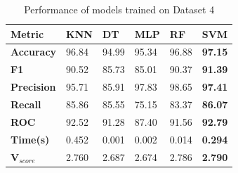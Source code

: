 \begin{table}[H]
  \centering
  \caption{Performance of models trained on Dataset 4}\label{tab:performance_of_models_trained_on_dataset_4}
  \begin{tabular}{|p{5em}|C{3em}|C{3em}|C{3em}|C{3em}|C{3em}|}
    \hline
    \textbf{Metric}      & \textbf{KNN} & \textbf{DT} & \textbf{MLP} & \textbf{RF} & \textbf{SVM}   \\
    \hline
    \textbf{Accuracy}    & 96.84        & 94.99       & 95.34        & 96.88       & \textbf{97.15} \\
    \textbf{F1}          & 90.52        & 85.73       & 85.01        & 90.37       & \textbf{91.39} \\
    \textbf{Precision}   & 95.71        & 85.91       & 97.83        & 98.65       & \textbf{97.41} \\
    \textbf{Recall}      & 85.86        & 85.55       & 75.15        & 83.37       & \textbf{86.07} \\
    \textbf{ROC}         & 92.52        & 91.28       & 87.40        & 91.56       & \textbf{92.79} \\
    \textbf{Time(s)}     & 0.452        & 0.001       & 0.002        & 0.014       & \textbf{0.294} \\
    \hline
    \textbf{V$_{score}$} & 2.760        & 2.687       & 2.674        & 2.786       & \textbf{2.790} \\
    \hline
  \end{tabular}
\end{table}

